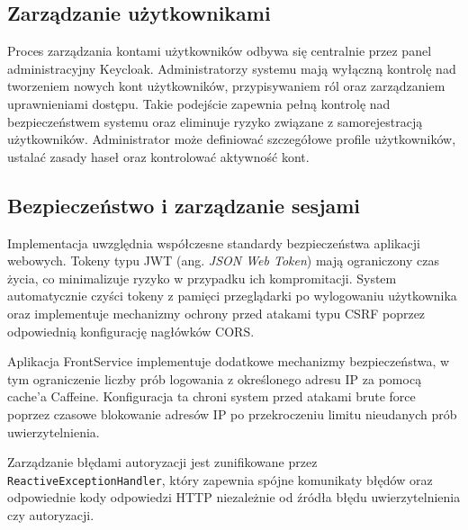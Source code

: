 \subsection{Zarządzanie użytkownikami}

Proces zarządzania kontami użytkowników odbywa się centralnie przez panel administracyjny Keycloak. Administratorzy systemu mają wyłączną kontrolę nad tworzeniem nowych kont użytkowników, przypisywaniem ról oraz zarządzaniem uprawnieniami dostępu. Takie podejście zapewnia pełną kontrolę nad bezpieczeństwem systemu oraz eliminuje ryzyko związane z samorejestracją użytkowników. Administrator może definiować szczegółowe profile użytkowników, ustalać zasady haseł oraz kontrolować aktywność kont. 

\subsection{Bezpieczeństwo i zarządzanie sesjami}

Implementacja uwzględnia współczesne standardy bezpieczeństwa aplikacji webowych. Tokeny typu JWT (ang. \textit{JSON Web Token}) mają ograniczony czas życia, co minimalizuje ryzyko w przypadku ich kompromitacji. System automatycznie czyści tokeny z pamięci przeglądarki po wylogowaniu użytkownika oraz implementuje mechanizmy ochrony przed atakami typu CSRF poprzez odpowiednią konfigurację nagłówków CORS.

Aplikacja FrontService implementuje dodatkowe mechanizmy bezpieczeństwa, w tym ograniczenie liczby prób logowania z określonego adresu IP za pomocą cache'a Caffeine. Konfiguracja ta chroni system przed atakami brute force poprzez czasowe blokowanie adresów IP po przekroczeniu limitu nieudanych prób uwierzytelnienia.

Zarządzanie błędami autoryzacji jest zunifikowane przez \texttt{ReactiveExceptionHandler}, który zapewnia spójne komunikaty błędów oraz odpowiednie kody odpowiedzi HTTP niezależnie od źródła błędu uwierzytelnienia czy autoryzacji. 